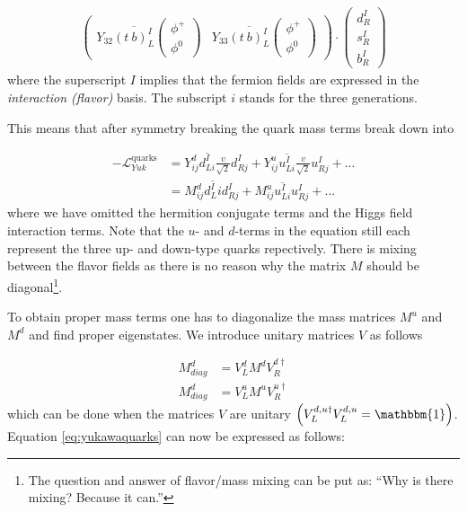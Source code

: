 \begin{equation}
\begin{split}
\begin{pmatrix}
Y_{32}\overline{\left(t \ b\right)^I_L}\begin{pmatrix} \phi^+ \\ \phi^0 \end{pmatrix} &
Y_{33}\overline{\left(t \ b\right)^I_L}\begin{pmatrix} \phi^+ \\ \phi^0 \end{pmatrix}
\end{pmatrix}
\cdot \begin{pmatrix} d^I_R \\ s^I_R \\b^I_R \end{pmatrix}
\end{split}
\end{equation}
where the superscript $I$ implies that the fermion fields are expressed in the \textit{interaction (flavor)} basis. The subscript $i$ stands for the three generations.

This means that after symmetry breaking the quark mass terms break down into

\begin{equation}
\label{eq:yukawaquarks}
\begin{split}
-\mathcal{L}^{\textrm{quarks}}_{Yuk} &= Y^d_{ij}\overline{d^I_{Li}} \frac{v}{\sqrt{2}}d^I_{Rj} + Y^u_{ij} \overline{u^I_{Li}} \frac{v}{\sqrt{2}} u^I_{Rj} + ...\\
&= M^d_{ij} \overline{d^I_Li} d^I_{Rj} + M^u_{ij} \overline{u^I_{Li}} u^I_{Rj} + ...
\end{split}
\end{equation}
where we have omitted the hermition conjugate terms and the Higgs field interaction terms. Note that the $u$- and $d$-terms in the equation still each represent the three up- and down-type quarks repectively. There is mixing between the flavor fields as there is no reason why the matrix $M$ should be diagonal\footnote{The question and answer of flavor/mass mixing can be put as: ``Why is there mixing? Because it can.''}.

To obtain proper mass terms one has to diagonalize the mass matrices $M^u$ and $M^d$ and find proper eigenstates. We introduce unitary matrices $V$ as follows

\begin{equation}
\begin{split}
M^d_{diag} &= V^d_L M^d V^{d\dagger}_R\\
M^d_{diag} &= V^u_L M^u V^{u\dagger}_R
\end{split}
\end{equation}
which can be done when the matrices $V$ are unitary $\left(V^{d,u\dagger}_L V^{d,u}_L = \mathbbm{1}\right)$. Equation \ref{eq:yukawaquarks} can now be expressed as follows:

